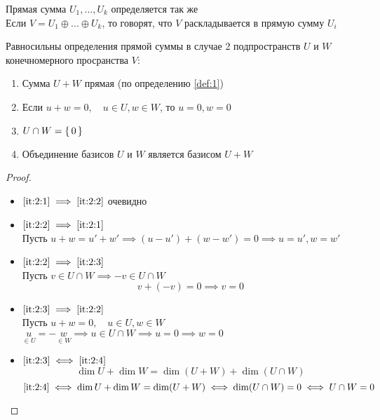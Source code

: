 \begin{remark}
	Прямая сумма $U_1, ..., U_k$ определяется так же \\
    Если $ V = U_1 \oplus ... \oplus U_k $, то говорят, что $V$ раскладывается в прямую сумму $U_i$
\end{remark}

\begin{theorem}
	Равносильны определения прямой суммы в случае 2 подпространств $U$ и $W$ конечномерного просранства $V$:
    \begin{enumerate}
        \item \label{it:2:1} Сумма $U + W $ прямая (по определению \ref{def:1})
        \item \label{it:2:2} Если $ u + w = 0, \quad u \in U, w \in W $, то $u = 0, w = 0 $
        \item \label{it:2:3} $ U \cap W = \set{0} $
        \item \label{it:2:4} Объединение базисов $U$ и $W$ является базисом $U + W$
    \end{enumerate}
\end{theorem}

\begin{proof}
	\hfill
    \begin{itemize}
        \item $ \ref{it:2:1} \implies \ref{it:2:2} $ очевидно
        \item $ \ref{it:2:2} \implies \ref{it:2:1} $ \\
        Пусть $ u + w = u' + w' \implies (u - u') + (w - w') = 0 \implies u = u', w = w' $
        \item $ \ref{it:2:2} \implies \ref{it:2:3} $ \\
        Пусть $ v \in U \cap W \implies -v \in U \cap W $
        $$ v + (-v) = 0 \implies v = 0 $$
        \item $ \ref{it:2:3} \implies \ref{it:2:2} $ \\
        Пусть $ u + w = 0, \quad u \in U, w \in W $ \\
        $ \underset{\in U}u = -\underset{\in W}w \implies u \in U \cap W \implies u = 0 \implies w = 0 $
        \item $ \ref{it:2:3} \iff \ref{it:2:4} $
        $$ \dim U + \dim W = \dim (U + W) + \dim (U \cap W) $$
        $$ \ref{it:2:4} \iff \dim U + \dim W = \dim (U + W) \iff \dim (U \cap W) = 0 \iff U \cap W = 0 $$
    \end{itemize}
\end{proof}

